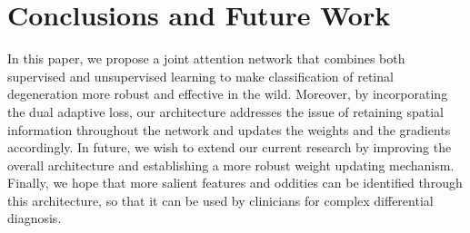 \documentclass{article}
\begin{document}
\section{Conclusions and Future Work}
In this paper, we propose a joint attention network that combines both supervised and unsupervised learning to make classification of retinal degeneration more robust and effective in the wild. Moreover, by incorporating the dual adaptive loss, our architecture addresses the issue of retaining spatial information throughout the network and updates the weights and the gradients accordingly. In future, we wish to extend our current research by improving the overall architecture and establishing a more robust weight updating mechanism. Finally, we hope that more salient features and oddities can be identified through this architecture, so that it can be used by clinicians for complex differential diagnosis.


\end{document}
